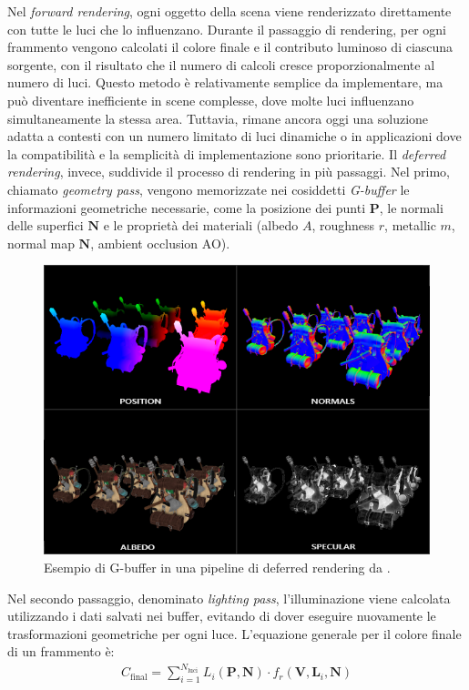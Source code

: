 \documentclass[12pt,a4paper,openright,twoside]{book}
\begin{document}
Nel \emph{forward rendering}, ogni oggetto della scena viene renderizzato direttamente con tutte le luci che lo influenzano.
Durante il passaggio di rendering, per ogni frammento vengono calcolati il colore finale e il contributo luminoso
di ciascuna sorgente, con il risultato che il numero di calcoli cresce proporzionalmente al numero di luci.
Questo metodo è relativamente semplice da implementare, ma può diventare inefficiente in scene complesse, dove molte
luci influenzano simultaneamente la stessa area. Tuttavia, rimane ancora oggi una soluzione adatta a contesti con un
numero limitato di luci dinamiche o in applicazioni dove la compatibilità e la semplicità di implementazione sono prioritarie.
Il \emph{deferred rendering}, invece, suddivide il processo di rendering in più passaggi. Nel primo, chiamato
\emph{geometry pass}, vengono memorizzate nei cosiddetti \emph{G-buffer} le informazioni geometriche necessarie,
come la posizione dei punti \(\mathbf{P}\), le normali delle superfici \(\mathbf{N}\) e le proprietà dei materiali
(albedo \(A\), roughness \(r\), metallic \(m\), normal map \(\mathbf{N}\), ambient occlusion AO).
\begin{figure}[H]
   \centering
   \includegraphics[width=.8\linewidth]{figures/g_buffer_example.png}
   \caption{Esempio di G-buffer in una pipeline di deferred rendering da \cite{learnopengl}.}
   \label{fig:g-buffer-example}
\end{figure}
Nel secondo passaggio, denominato \emph{lighting pass}, l'illuminazione viene calcolata utilizzando i dati salvati nei buffer,
evitando di dover eseguire nuovamente le trasformazioni geometriche per ogni luce. L'equazione generale per il colore finale
di un frammento è:
\begin{align*}
C_{\text{final}} = \sum_{i=1}^{N_\text{luci}} L_i(\mathbf{P}, \mathbf{N}) \cdot f_r(\mathbf{V}, \mathbf{L}_i, \mathbf{N})
\end{align*}
\end{document}
